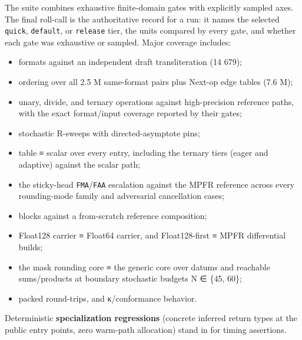 The suite combines exhaustive finite-domain gates with explicitly sampled axes. The final roll-call is the authoritative record for a run: it names the selected \texttt{quick}, \texttt{default}, or \texttt{release} tier, the units compared by every gate, and whether each gate was exhaustive or sampled. Major coverage includes:



\begin{itemize}
\item formats against an independent draft transliteration (14 679);


\item ordering over all 2.5 M same-format pairs plus Next-op edge tables (7.6 M);


\item unary, divide, and ternary operations against high-precision reference paths, with the exact format/input coverage reported by their gates;


\item stochastic R-sweeps with directed-asymptote pins;


\item table ≡ scalar over every entry, including the ternary tiers (eager and adaptive) against the scalar path;


\item the sticky-head \texttt{FMA}/\allowbreak\texttt{FAA} escalation against the MPFR reference across every rounding-mode family and adversarial cancellation cases;


\item blocks against a from-scratch reference composition;


\item Float128 carrier ≡ Float64 carrier, and Float128-first ≡ MPFR differential builds;


\item the mask rounding core ≡ the generic core over datums and reachable sums/products at boundary stochastic budgets N ∈ \{45, 60\};


\item packed round-trips, and κ/conformance behavior.

\end{itemize}


Deterministic \textbf{specialization regressions} (concrete inferred return types at the public entry points, zero warm-path allocation) stand in for timing assertions.




